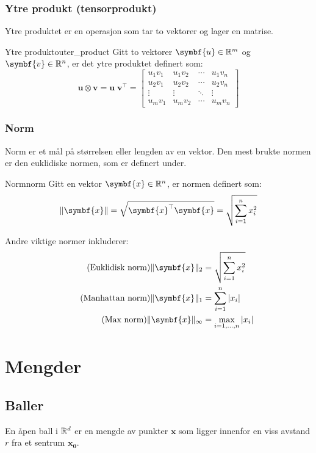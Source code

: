 \subsubsection{Ytre produkt (tensorprodukt)}
Ytre produktet er en operasjon som tar to vektorer og lager en matrise.
\begin{definition}{Ytre produkt}{outer_product}
	Gitt to vektorer \( \symbf{u} \in \R^m \) og \( \symbf{v} \in \R^n \), er det ytre produktet definert som:
	\[
		\symbf{u} \otimes \symbf{v} = \symbf{u} \; \symbf{v}^\top =
		\begin{bmatrix}
			u_1v_1 & u_1v_2 & \cdots & u_1v_n \\
			u_2v_1 & u_2v_2 & \cdots & u_2v_n \\
			\vdots & \vdots & \ddots & \vdots \\
			u_mv_1 & u_mv_2 & \cdots & u_mv_n
		\end{bmatrix}
	\]
\end{definition}

\subsubsection{Norm}
Norm er et mål på størrelsen eller lengden av en vektor. Den mest brukte normen er den euklidiske normen, som er definert under.

\begin{definition}{Norm}{norm}
	Gitt en vektor \( \symbf{x} \in \R^n \), er normen definert som:
	\[
		\norm{\symbf{x}} = \sqrt{\symbf{x}^\top \symbf{x}} = \sqrt{\sum_{i=1}^{n} x_i^2}
	\]
\end{definition}

Andre viktige normer inkluderer:
\begin{align*}
	\tag{Euklidisk norm} \norm{\symbf{x}}_2 &= \sqrt{\sum_{i=1}^{n} x_i^2} \\
	\tag{Manhattan norm} \norm{\symbf{x}}_1 &= \sum_{i=1}^{n} |x_i| \\
	\tag{Max norm} \norm{\symbf{x}}_\infty &= \max_{i=1,\ldots,n} |x_i|
\end{align*}


\section{Mengder}
\subsection{Baller}
En åpen ball i \(\mathbb{R}^d\) er en mengde av punkter \(\mathbf{x}\) som ligger innenfor en viss avstand \(r\) fra et sentrum \(\mathbf{x_0}\).

